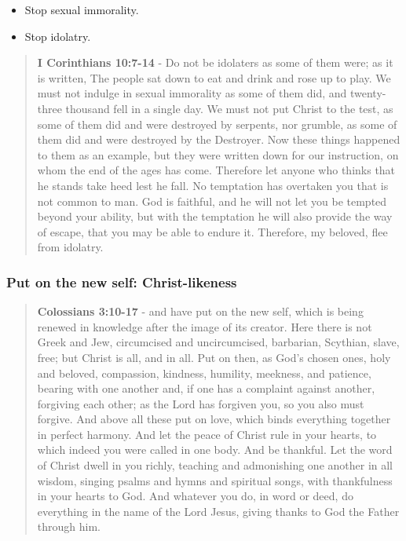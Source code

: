 \documentclass[11pt]{article}
\begin{document}
\begin{itemize}
\item Stop sexual immorality.
\item Stop idolatry.
\end{itemize}

\begin{quote}
\textbf{I Corinthians 10:7-14} - Do not be idolaters as some of them were; as it is written, The people sat down to eat and drink and rose up to play. We must not indulge in sexual immorality as some of them did, and twenty-three thousand fell in a single day. We must not put Christ to the test, as some of them did and were destroyed by serpents, nor grumble, as some of them did and were destroyed by the Destroyer. Now these things happened to them as an example, but they were written down for our instruction, on whom the end of the ages has come. Therefore let anyone who thinks that he stands take heed lest he fall. No temptation has overtaken you that is not common to man. God is faithful, and he will not let you be tempted beyond your ability, but with the temptation he will also provide the way of escape, that you may be able to endure it. Therefore, my beloved, flee from idolatry.
\end{quote}

\subsubsection{Put on the new self: Christ-likeness}
\label{sec:orgc668023}
\begin{quote}
\textbf{Colossians 3:10-17} - and have put on the new self, which is being renewed in knowledge after the image of its creator. Here there is not Greek and Jew, circumcised and uncircumcised, barbarian, Scythian, slave, free; but Christ is all, and in all. Put on then, as God's chosen ones, holy and beloved, compassion, kindness, humility, meekness, and patience, bearing with one another and, if one has a complaint against another, forgiving each other; as the Lord has forgiven you, so you also must forgive. And above all these put on love, which binds everything together in perfect harmony. And let the peace of Christ rule in your hearts, to which indeed you were called in one body. And be thankful. Let the word of Christ dwell in you richly, teaching and admonishing one another in all wisdom, singing psalms and hymns and spiritual songs, with thankfulness in your hearts to God. And whatever you do, in word or deed, do everything in the name of the Lord Jesus, giving thanks to God the Father through him.
\end{quote}
\end{document}

